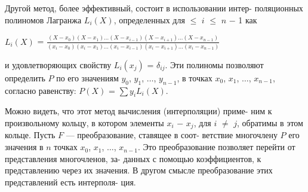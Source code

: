 \vspace{0pt}Другой метод, более эффективный, состоит в использовании интер­- \linebreak
поляционных полиномов Лагранжа $L_i(X)$, определенных для  $\leqslant$ $i$ $\leqslant$ $n$ $-$ 1 как

\begin{center}
$L_i(X)$ = $\frac{(X - x_0)(X - x_1) \dots (X - x_{i - 1})(X - x_{i + 1}) \dots (X - x_{n - 1})}{(x_i - x_0)(x_i - x_1) \dots (x_i - x_{i - 1})(x_i - x_{i + 1}) \dots (x_i - x_{n - 1})}$
\end{center}

\noindent и удовлетворяющих свойству $L_i(x_j)$ = $\delta_{ij}$. Эти полиномы позволяют \linebreak
определить $P$ по его значениям $y_0$, $y_1$, $\dots$,  $y_{n - 1}$, в точках  $x_0$,  $x_1$, $\dots$, \linebreak
 $x_{n - 1}$, согласно равенству: $P(X)$ = $\sum y_i L_i(X)$. \ 

\vspace{0pt}Можно видеть, что этот метод вычисления (интерполяции) приме­- \linebreak
ним к произвольному кольцу, в котором элементы $x_i$ $-$ $x_j$, для $i$ $\ne$ $j$, \linebreak
обратимы в этом кольце. Пусть $F$ --- преобразование, ставящее в соот­- \linebreak
ветствие многочлену $P$ его значения в $n$ точках $x_0$,  $x_1$, $\dots$,  $x_{n - 1}$. Это \linebreak
преобразование позволяет перейти от представления многочленов, за­- \linebreak
данных с помощью коэффициентов, к представлению через их значения. \linebreak
В другом смысле преобразование этих представлений есть интерполя­- \linebreak
ция. \ 

